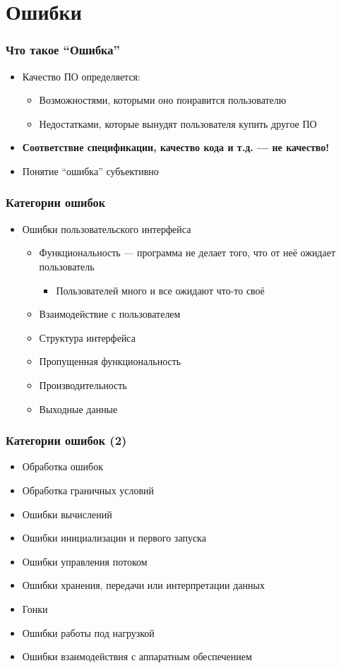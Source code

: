 \documentclass[xetex,mathserif,serif]{beamer}
\begin{document}
	\section{Ошибки}

	\begin{frame}
		\frametitle{Что такое ``Ошибка''}
		\begin{itemize}
			\item Качество ПО определяется:
			\begin{itemize}
				\item Возможностями, которыми оно понравится пользователю
				\item Недостатками, которые вынудят пользователя купить другое ПО
			\end{itemize}
			\item \textbf{Соответствие спецификации, качество кода и т.д. --- не качество!}
			\item Понятие ``ошибка'' субъективно
		\end{itemize}
	\end{frame}

	\begin{frame}
		\frametitle{Категории ошибок}
		\begin{itemize}
			\item Ошибки пользовательского интерфейса
			\begin{itemize}
				\item Функциональность --- программа не делает того, что от неё ожидает пользователь
				\begin{itemize}
					\item Пользователей много и все ожидают что-то своё
				\end{itemize}
				\item Взаимодействие с пользователем
				\item Структура интерфейса
				\item Пропущенная функциональность
				\item Производительность
				\item Выходные данные
			\end{itemize}
		\end{itemize}
	\end{frame}

	\begin{frame}
		\frametitle{Категории ошибок (2)}
		\begin{itemize}
			\item Обработка ошибок
			\item Обработка граничных условий
			\item Ошибки вычислений
			\item Ошибки инициализации и первого запуска
			\item Ошибки управления потоком
			\item Ошибки хранения, передачи или интерпретации данных
			\item Гонки
			\item Ошибки работы под нагрузкой
			\item Ошибки взаимодействия с аппаратным обеспечением			
		\end{itemize}
	\end{frame}
\end{document}
